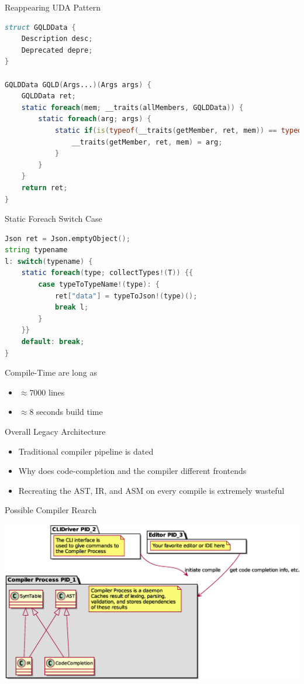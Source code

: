 \documentclass[aspectratio=169,notes]{beamer}
\begin{document}
	\begin{frame}[fragile]{Reappearing UDA Pattern}
\begin{lstlisting}[language=D,basicstyle=\scriptsize\ttfamily]
struct GQLDData {
	Description desc;
	Deprecated depre;
}

GQLDData GQLD(Args...)(Args args) {
	GQLDData ret;
	static foreach(mem; __traits(allMembers, GQLDData)) {
		static foreach(arg; args) {
			static if(is(typeof(__traits(getMember, ret, mem)) == typeof(arg))) {
				__traits(getMember, ret, mem) = arg;
			}
		}
	}
	return ret;
}
\end{lstlisting}
	\end{frame}

	\begin{frame}[fragile]{Static Foreach Switch Case}
\begin{lstlisting}[language=D,basicstyle=\scriptsize\ttfamily]
Json ret = Json.emptyObject();
string typename
l: switch(typename) {
	static foreach(type; collectTypes!(T)) {{
		case typeToTypeName!(type): {
			ret["data"] = typeToJson!(type)();
			break l;
		}
	}}
	default: break;
}
\end{lstlisting}
	\end{frame}

	\begin{frame}[fragile]{Compile-Time are long as}
		\begin{itemize}
			\item $\approx{} 7000$ lines
			\item $\approx{} 8$ seconds build time
		\end{itemize}
	\end{frame}

	\begin{frame}[fragile]{Overall Legacy Architecture}
		\begin{itemize}
			\item Traditional compiler pipeline is dated
			\item Why does code-completion and the compiler different frontends
			\item Recreating the AST, IR, and ASM on every compile is extremely wasteful
		\end{itemize}
	\end{frame}

	\begin{frame}{Possible Compiler Rearch}
		\begin{center}
		\includegraphics[height=0.9\textheight]{rearch.eps}
		\end{center}
	\end{frame}


	\printbibliography
\end{document}
